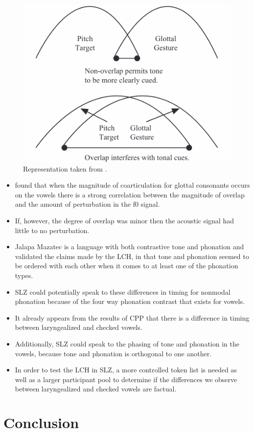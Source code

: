\documentclass[12pt, letterpaper]{article}
\begin{document}
	\begin{figure}[!ht]
		\centering
		\includegraphics[width=.5\textwidth]{../Gestures.png}
		\caption{Representation taken from \citet{dicanioCoarticulationToneGlottal2012}.}
		\label{fig:GlottalGestures}
	\end{figure}
\begin{itemize}
	\item \citet{dicanioCoarticulationToneGlottal2012} found that when the magnitude of coarticulation for glottal consonants occurs on the vowels there is a strong correlation between the magnitude of overlap and the amount of perturbation in the f0 signal. 
	\item If, however, the degree of overlap was minor then the acoustic signal had little to no perturbation.
	\item Jalapa Mazatec is a language with both contrastive tone and phonation and \citet{garellekAcousticConsequencesPhonation2011} validated the claims made by the LCH, in that tone and phonation seemed to be ordered with each other when it comes to at least one of the phonation types.
	\item SLZ could potentially speak to these differences in timing for nonmodal phonation because of the four way phonation contrast that exists for vowels. 
	\item It already appears from the results of CPP that there is a difference in timing between laryngealized and checked vowels. 
	\item Additionally, SLZ could speak to the phasing of tone and phonation in the vowels, because tone and phonation is orthogonal to one another. 
	\item In order to test the LCH in SLZ, a more controlled token list is needed as well as a larger participant pool to determine if the differences we observe between laryngealized and checked vowels are factual. 
\end{itemize}

\section{Conclusion} \label{sec:Conclusion}
\end{document}

